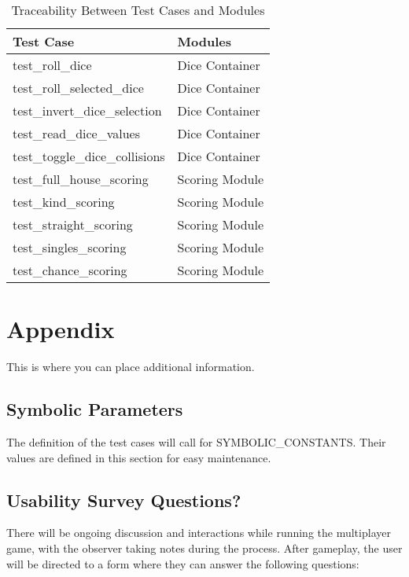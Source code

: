 \documentclass[12pt, titlepage]{article}
\begin{document}
\begin{table}[H]
  \centering
  \begin{tabular}{p{} p{}}
    \toprule
    \textbf{Test Case} & \textbf{Modules} \\
    \midrule
    test\_roll\_dice & Dice Container \\
    test\_roll\_selected\_dice & Dice Container \\
    test\_invert\_dice\_selection & Dice Container \\
    test\_read\_dice\_values & Dice Container \\
    test\_toggle\_dice\_collisions & Dice Container \\
    test\_full\_house\_scoring & Scoring Module \\
    test\_kind\_scoring & Scoring Module \\
    test\_straight\_scoring & Scoring Module \\
    test\_singles\_scoring & Scoring Module \\
    test\_chance\_scoring & Scoring Module \\
    \bottomrule
  \end{tabular}
  \caption{Traceability Between Test Cases and Modules}
  \label{TblTraceability}
\end{table}

\newpage




\newpage

\section{Appendix}

This is where you can place additional information.

\subsection{Symbolic Parameters}

The definition of the test cases will call for SYMBOLIC\_CONSTANTS.
Their values are defined in this section for easy maintenance.

\subsection{Usability Survey Questions?}

There will be ongoing discussion and interactions while running the multiplayer game, with the observer taking notes during the process. After gameplay, the user will be directed to a form where they can answer the following questions:
\end{document}
